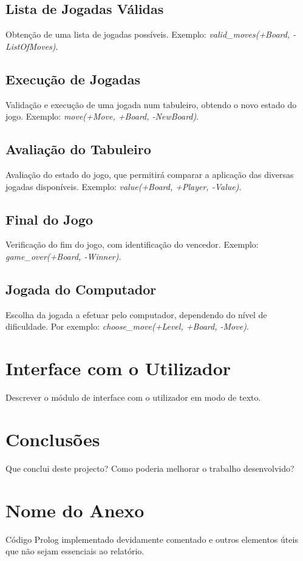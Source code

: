 \documentclass[a4paper]{article}
\begin{document}
\subsection{Lista de Jogadas Válidas} Obtenção de uma lista de jogadas possíveis. Exemplo: \textit{valid\_moves(+Board, -ListOfMoves)}.

\subsection{Execução de Jogadas} Validação e execução de uma jogada num tabuleiro, obtendo o novo estado do jogo. Exemplo: \textit{move(+Move, +Board, -NewBoard)}.

\subsection{Avaliação do Tabuleiro} Avaliação do estado do jogo, que permitirá comparar a aplicação das diversas jogadas disponíveis. Exemplo: \textit{value(+Board, +Player, -Value)}.

\subsection{Final do Jogo} Verificação do fim do jogo, com identificação do vencedor. Exemplo: \textit{game\_over(+Board, -Winner)}.

\subsection{Jogada do Computador} Escolha da jogada a efetuar pelo computador, dependendo do nível de dificuldade. Por exemplo: \textit{choose\_move(+Level, +Board, -Move)}.


\section{Interface com o Utilizador}

Descrever o módulo de interface com o utilizador em modo de texto.


\section{Conclusões}
Que conclui deste projecto? Como poderia melhorar o trabalho desenvolvido?


\clearpage
{}
\renewcommand\refname{Bibliografia}



\newpage
\appendix
\section{Nome do Anexo}
Código Prolog implementado devidamente comentado e outros elementos úteis que não sejam essenciais ao relatório.
\end{document}
